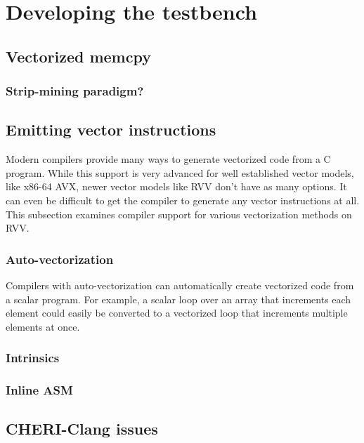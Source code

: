 \section{Developing the testbench}\label{chap:software:sec:testbench}

\subsection{Vectorized memcpy}

\subsubsection{Strip-mining paradigm?}

\subsection{Emitting vector instructions}
Modern compilers provide many ways to generate vectorized code from a C program.
While this support is very advanced for well established vector models, like x86-64 AVX, newer vector models like RVV don't have as many options.
It can even be difficult to get the compiler to generate any vector instructions at all.
This subsection examines compiler support for various vectorization methods on RVV.


\subsubsection{Auto-vectorization}
Compilers with auto-vectorization can automatically create vectorized code from a scalar program.
For example, a scalar loop over an array that increments each element could easily be converted to a vectorized loop that increments multiple elements at once.



\subsubsection{Intrinsics}
\subsubsection{Inline ASM}

\subsection{CHERI-Clang issues}
